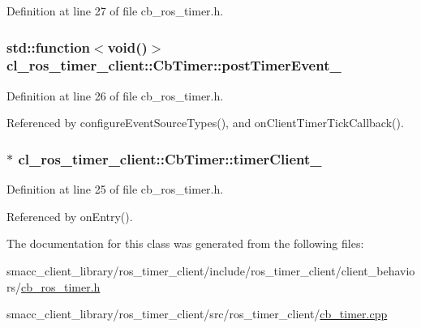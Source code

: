 Definition at line 27 of file cb\+\_\+ros\+\_\+timer.\+h.

\subsubsection[{\texorpdfstring{post\+Timer\+Event\+\_\+}{postTimerEvent_}}]{\setlength{\rightskip}{0pt plus 5cm}std\+::function$<$void()$>$ cl\+\_\+ros\+\_\+timer\+\_\+client\+::\+Cb\+Timer\+::post\+Timer\+Event\+\_\+\hspace{0.3cm}{\ttfamily [private]}}\hypertarget{classcl__ros__timer__client_1_1CbTimer_abf76f24311c8ad19f0abc4b76457f45b}{}\label{classcl__ros__timer__client_1_1CbTimer_abf76f24311c8ad19f0abc4b76457f45b}


Definition at line 26 of file cb\+\_\+ros\+\_\+timer.\+h.



Referenced by configure\+Event\+Source\+Types(), and on\+Client\+Timer\+Tick\+Callback().

\subsubsection[{\texorpdfstring{timer\+Client\+\_\+}{timerClient_}}]{$\ast$ cl\+\_\+ros\+\_\+timer\+\_\+client\+::\+Cb\+Timer\+::timer\+Client\+\_\+\hspace{0.3cm}{\ttfamily [private]}}\hypertarget{classcl__ros__timer__client_1_1CbTimer_af23359781ad6f7dae40cf0c9c1b3e48e}{}\label{classcl__ros__timer__client_1_1CbTimer_af23359781ad6f7dae40cf0c9c1b3e48e}


Definition at line 25 of file cb\+\_\+ros\+\_\+timer.\+h.



Referenced by on\+Entry().



The documentation for this class was generated from the following files\+:\begin{DoxyCompactItemize}
\item 
smacc\+\_\+client\+\_\+library/ros\+\_\+timer\+\_\+client/include/ros\+\_\+timer\+\_\+client/client\+\_\+behaviors/\hyperlink{cb__ros__timer_8h}{cb\+\_\+ros\+\_\+timer.\+h}\item 
smacc\+\_\+client\+\_\+library/ros\+\_\+timer\+\_\+client/src/ros\+\_\+timer\+\_\+client/\hyperlink{cb__timer_8cpp}{cb\+\_\+timer.\+cpp}\end{DoxyCompactItemize}
